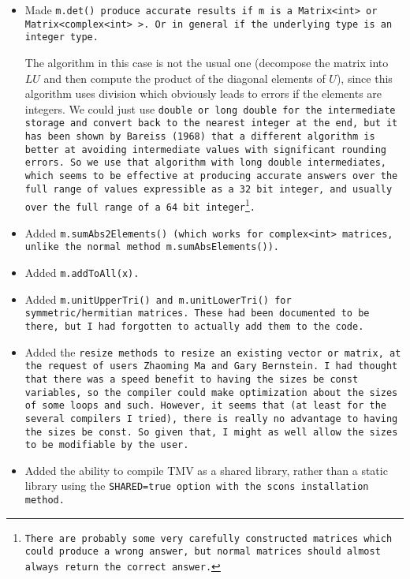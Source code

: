 \begin{itemize}

\item Made \tt{m.det()} produce accurate results if \tt{m} is a \tt{Matrix<int>} or 
\tt{Matrix<complex<int> >}.  Or in general if the underlying type is an integer type.

The algorithm in this case is not the usual one (decompose the matrix into $LU$ and
then compute the product of the diagonal elements of $U$), since this algorithm uses division which obviously leads to errors if the elements are integers.  
We could just use \tt{double} or \tt{long double} for
the intermediate storage and convert back to the nearest integer at the end, but it has
been shown by Bareiss (1968) that a different algorithm is better at avoiding intermediate
values with significant rounding errors.  So we use that algorithm with \tt{long double} 
intermediates, which seems to be effective at producing accurate answers over the 
full range of values expressible as a 32 bit integer, and usually over the full range of a 64 bit 
integer\footnote{There are probably some very carefully constructed matrices which could produce 
a wrong answer, but normal matrices should almost always return the correct answer.}.

\item Added \tt{m.sumAbs2Elements()} (which works for \tt{complex<int>} matrices, unlike the normal method \tt{m.sumAbsElements()}).

\item Added \tt{m.addToAll(x)}.

\item Added \tt{m.unitUpperTri()} and \tt{m.unitLowerTri()} for symmetric/hermitian matrices.
These had been documented to be there, but I had forgotten to actually add them to the code.

\item Added the \tt{resize} methods to resize an existing vector or matrix, at the request of users Zhaoming Ma and Gary Bernstein.  
I had thought that there was a speed benefit to having the sizes be \tt{const} variables, so the compiler could make optimization about the sizes of some loops and such.  However, it seems that (at least for the several compilers I tried), there is really no advantage to having the sizes be \tt{const}.  So given that, I might as well allow the sizes to be modifiable by the user.

\item Added the ability to compile TMV as a shared library, rather than a static library 
using the \tt{SHARED=true} option with the scons installation method.


\end{itemize}
